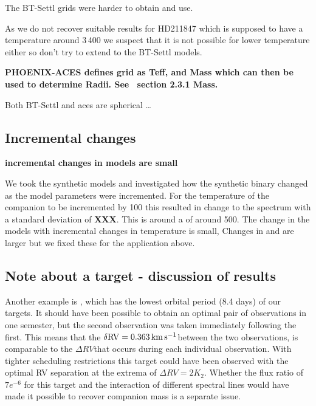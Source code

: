 The {BT-Settl} grids were harder to obtain and use.

As we do not recover suitable results for HD211847 which is supposed to have a temperature around 3\,400\K{} we suspect that it is not possible for lower temperature either so don't try to extend to the {BT-Settl} models.


\textbf{
     {PHOENIX-ACES}  defines grid as Teff,\logg{} and Mass which can then be used to determine Radii.
See~\citep{husser_new_2013} section 2.3.1 Mass.}

Both {BT-Settl} and aces are spherical
\ldots{}




\subsection{Incremental changes}
\textbf{incremental changes in models are small}

We took the synthetic models and investigated how the synthetic binary changed as the model parameters were incremented.
For the temperature of the companion to be incremented by 100\K{} this resulted in change to the spectrum with a standard deviation of \textbf{XXX}.
This is around a \snr{} of around 500.
The change in the models with incremental changes in temperature is small, Changes in \logg{} and \feh{} are larger but we fixed these for the application above.





\subsection{Note about a target - discussion of results}
Another example is , which has the lowest orbital period (8.4 days) of our targets.
It should have been possible to obtain an optimal pair of observations in one semester, but the second observation was taken immediately following the first.
This means that the \(\rm \delta {RV} = 0.363\,\si{\kilo\metre\per\second}{}\)between the two observations, is comparable to the \(\Delta {RV}\)that occurs during each individual observation.
With tighter scheduling restrictions this target could have been observed with the optimal {RV} separation at the extrema of \(\Delta {RV}=2 K_{2}\).
Whether the flux ratio of \(7e^{-6}\) for this target and the interaction of different spectral lines would have made it possible to recover companion mass is a separate issue.



